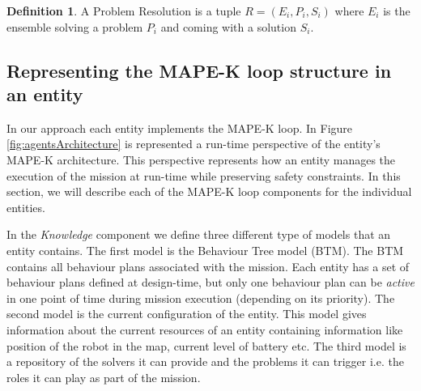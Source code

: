 \documentclass[journal]{IEEEtran}
\theoremstyle{definition}
\newtheorem{definition}{Definition}
\newcommand\ivano[1]{\nb{Ivano}{#1}}
\begin{document}
\begin{definition}
A Problem Resolution is a tuple $R=(E_i, P_i, S_i)$ where $E_i$ is the ensemble  solving a problem $P_i$ and coming with a solution $S_i$.
\end{definition}

\subsection{Representing the MAPE-K loop structure in an entity}


In our approach each entity implements the
MAPE-K loop. 
In Figure \ref{fig:agentsArchitecture} is represented a run-time perspective of the entity's MAPE-K architecture. This perspective represents how an entity manages the execution of the mission at run-time while preserving safety constraints.
In this section, we will describe each of the MAPE-K loop components for the individual entities. 

In the \textit{Knowledge} component we define three different type of models that an entity contains. The first model is the Behaviour Tree model (BTM). The BTM contains all behaviour plans associated with the mission. Each entity has a set of behaviour plans defined at design-time, but only one behaviour plan can be \textit{active} in one point of time during mission execution (depending on its priority).
The second model is the current configuration of the entity. This model gives information about the current resources of an entity containing information like position of the robot in the map, current level of battery etc.
The third model is a repository of the solvers it can provide and the problems it can trigger i.e. the roles it can play as part of the mission.
\end{document}
